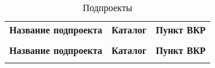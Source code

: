 \begin{centering}
    \begin{longtable}{|l|l|l|}
        \caption{Подпроекты} \label{libstable}                                                                                                                                                 \\

        \hline \multicolumn{1}{|c|}{\textbf{Название подпроекта}} & \multicolumn{1}{c|}{\textbf{Каталог}}                                            & \multicolumn{1}{c|}{\textbf{Пункт ВКР}} \\ \hhline{|=|=|=|}
        \endfirsthead

        \multicolumn{3}{c}%
        {\hspace{-12.5cm}{Окончание таблицы \thetable} \vspace{1ex}}                                                                                                                           \\
        \hline \multicolumn{1}{|c|}{\textbf{Название подпроекта}} & \multicolumn{1}{c|}{\textbf{Каталог}}                                            & \multicolumn{1}{c|}{\textbf{Пункт ВКР}} \\ \hhline{|=|=|=|}
        \endhead


\end{longtable}
\end{centering}
